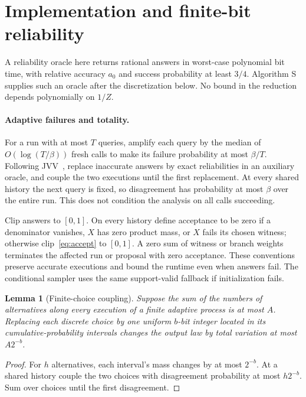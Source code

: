 \documentclass[11pt]{article}
\newtheorem{lemma}[theorem]{Lemma}
\begin{document}
\section{Implementation and finite-bit reliability}\label{sec:bits}
A reliability oracle here returns rational answers in worst-case polynomial
bit time, with relative accuracy $a_0$ and success probability at least
$3/4$. Algorithm S supplies such an oracle after the discretization below.
No bound in the reduction depends polynomially on $1/Z$.

\paragraph{Adaptive failures and totality.}
For a run with at most $T$ queries, amplify each query by the median of
$O(\log(T/\beta))$ fresh calls to make its failure probability at most
$\beta/T$. Following JVV~\cite[proof of Theorem 6.3]{jvv}, replace inaccurate answers
by exact reliabilities in an auxiliary oracle, and couple the two executions
until the first replacement.
At every shared history the next query is fixed, so disagreement has probability
at most $\beta$ over the entire run. This does not condition the analysis
on all calls succeeding.

Clip answers to $[0,1]$. On every history define acceptance to be zero if a
denominator vanishes, $X$ has zero product mass, or $X$ fails its chosen
witness; otherwise clip~\eqref{eq:accept} to $[0,1]$.
A zero sum of witness or branch weights terminates the affected run or
proposal with zero acceptance. These conventions preserve accurate executions
and bound the runtime even when answers fail. The conditional sampler uses
the same support-valid fallback if initialization fails.

\begin{lemma}[Finite-choice coupling]\label{lem:round}
Suppose the sum of the numbers of alternatives along every execution of a
finite adaptive process is at most $A$. Replacing each discrete choice by
one uniform $b$-bit integer located in its cumulative-probability intervals
changes the output law by total variation at most $A2^{-b}$.
\end{lemma}
\begin{proof}
For $h$ alternatives, each interval's mass changes by at most $2^{-b}$.
At a shared history couple the two choices with disagreement probability
at most $h2^{-b}$. Sum over choices until the first disagreement.
\end{proof}
\end{document}

